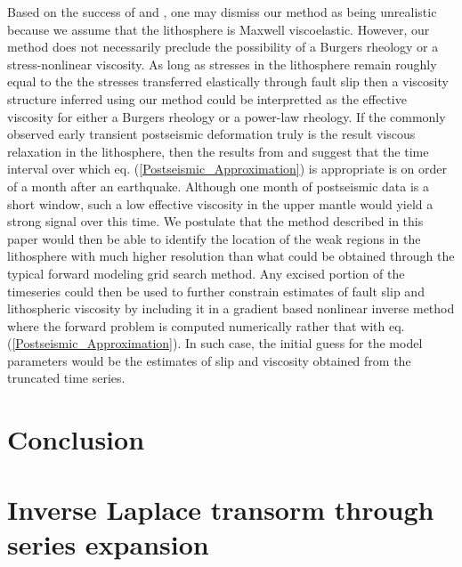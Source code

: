 \documentclass[extra,mreferee]{gji}
\begin{document}
Based on the success of \citet{P2003,P2005} and \citet{F2006b}, one
may dismiss our method as being unrealistic because we assume that the
lithosphere is Maxwell viscoelastic.  However, our method does not
necessarily preclude the possibility of a Burgers rheology or a
stress-nonlinear viscosity.  As long as stresses in the lithosphere
remain roughly equal to the the stresses transferred elastically
through fault slip then a viscosity structure inferred using our
method could be interpretted as the effective viscosity for either a
Burgers rheology or a power-law rheology.  If the commonly observed
early transient postseismic deformation truly is the result viscous
relaxation in the lithosphere, then the results from
\citet{P2003,P2005} and \citet{F2006b} suggest that the time interval
over which eq. (\ref{Postseismic_Approximation}) is appropriate is on
order of a month after an earthquake.  Although one month of
postseismic data is a short window, such a low effective viscosity in
the upper mantle would yield a strong signal over this time.  We
postulate that the method described in this paper would then be able to
identify the location of the weak regions in the lithosphere with much
higher resolution than what could be obtained through the typical
forward modeling grid search method.  Any excised portion of the
timeseries could then be used to further constrain estimates of fault
slip and lithospheric viscosity by including it in a gradient based
nonlinear inverse method where the forward problem is computed
numerically rather that with eq. (\ref{Postseismic_Approximation}). In
such case, the initial guess for the model parameters would be the
estimates of slip and viscosity obtained from the truncated time series.




\section{Conclusion}

\appendix
\section{Inverse Laplace transorm through series expansion}
\end{document}
